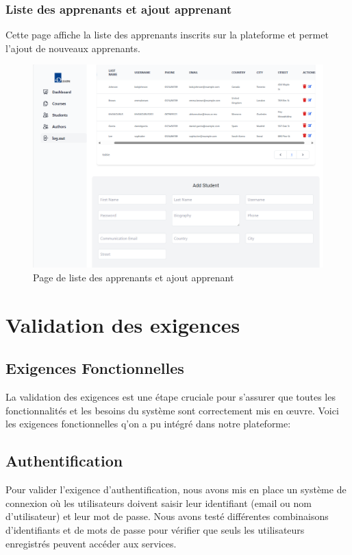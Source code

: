 \subsubsection{Liste des apprenants et ajout apprenant}

Cette page affiche la liste des apprenants inscrits sur la plateforme et permet l'ajout de nouveaux apprenants.

\begin{figure}[H]
    \centering
    \includegraphics[width=19cm]{Figures/addStudent.png}
    \caption{ Page de liste des apprenants et ajout apprenant}
\end{figure}

\section{Validation des exigences}

\subsection{Exigences Fonctionnelles}
La validation des exigences est une étape cruciale pour s'assurer que toutes les fonctionnalités et les besoins du système sont correctement mis en œuvre. Voici les exigences fonctionnelles q'on a pu intégré dans notre plateforme:

\subsection{Authentification}

Pour valider l'exigence d'authentification, nous avons mis en place un système de connexion où les utilisateurs doivent saisir leur identifiant (email ou nom d'utilisateur) et leur mot de passe. Nous avons testé différentes combinaisons d'identifiants et de mots de passe pour vérifier que seuls les utilisateurs enregistrés peuvent accéder aux services.


